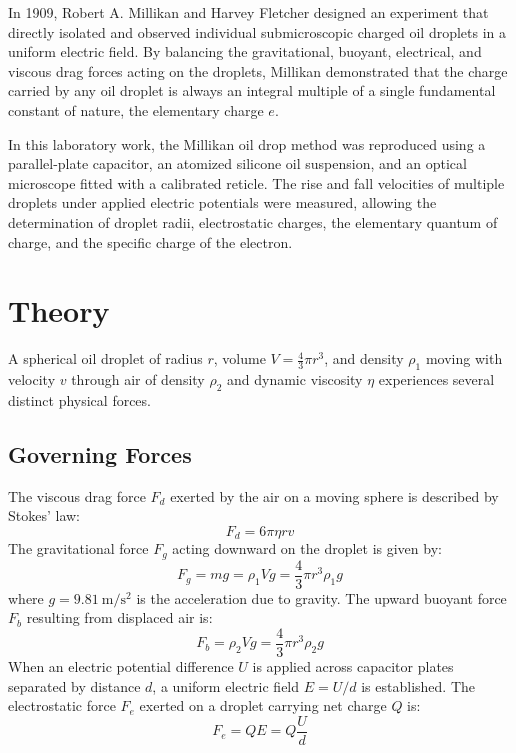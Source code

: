 \documentclass[journal]{IEEEtran}
\begin{document}
In 1909, Robert A. Millikan and Harvey Fletcher designed an experiment that directly isolated and observed individual submicroscopic charged oil droplets in a uniform electric field. By balancing the gravitational, buoyant, electrical, and viscous drag forces acting on the droplets, Millikan demonstrated that the charge carried by any oil droplet is always an integral multiple of a single fundamental constant of nature, the elementary charge $e$.

In this laboratory work, the Millikan oil drop method was reproduced using a parallel-plate capacitor, an atomized silicone oil suspension, and an optical microscope fitted with a calibrated reticle. The rise and fall velocities of multiple droplets under applied electric potentials were measured, allowing the determination of droplet radii, electrostatic charges, the elementary quantum of charge, and the specific charge of the electron.

\section{Theory}
A spherical oil droplet of radius $r$, volume $V = \frac{4}{3}\pi r^3$, and density $\rho_1$ moving with velocity $v$ through air of density $\rho_2$ and dynamic viscosity $\eta$ experiences several distinct physical forces.

\subsection{Governing Forces}
The viscous drag force $F_d$ exerted by the air on a moving sphere is described by Stokes' law:
\begin{equation}
    F_d = 6\pi \eta r v
    \label{eq:stokes}
\end{equation}
The gravitational force $F_g$ acting downward on the droplet is given by:
\begin{equation}
    F_g = m g = \rho_1 V g = \frac{4}{3}\pi r^3 \rho_1 g
    \label{eq:gravity}
\end{equation}
where $g = \SI{9.81}{\meter\per\second\squared}$ is the acceleration due to gravity. The upward buoyant force $F_b$ resulting from displaced air is:
\begin{equation}
    F_b = \rho_2 V g = \frac{4}{3}\pi r^3 \rho_2 g
    \label{eq:buoyancy}
\end{equation}
When an electric potential difference $U$ is applied across capacitor plates separated by distance $d$, a uniform electric field $E = U/d$ is established. The electrostatic force $F_e$ exerted on a droplet carrying net charge $Q$ is:
\begin{equation}
    F_e = Q E = Q \frac{U}{d}
    \label{eq:electric_force}
\end{equation}
\end{document}
